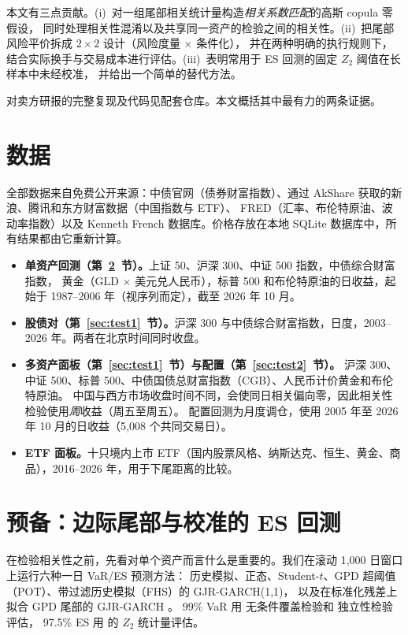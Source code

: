 \documentclass[11pt,UTF8]{ctexart}
\newcommand{\1}{\mathbf{1}}
\begin{document}
本文有三点贡献。(i)~对一组尾部相关统计量构造\emph{相关系数匹配}的高斯 copula 零假设，
同时处理相关性混淆以及共享同一资产的检验之间的相关性。(ii)~把尾部风险平价拆成 $2\times 2$ 设计（风险度量 $\times$ 条件化），
并在两种明确的执行规则下，结合实际换手与交易成本进行评估。(iii)~表明常用于 ES 回测的固定 $Z_2$ 阈值在长样本中未经校准，
并给出一个简单的替代方法。

对卖方研报的完整复现及代码见配套仓库。本文概括其中最有力的两条证据。

\section{数据}

全部数据来自免费公开来源：中债官网（债券财富指数）、通过 AkShare 获取的新浪、腾讯和东方财富数据（中国指数与 ETF）、
FRED（汇率、布伦特原油、波动率指数）以及 Kenneth French 数据库。价格存放在本地 SQLite 数据库中，所有结果都由它重新计算。

\begin{itemize}
\item \textbf{单资产回测（第~\ref{sec:marginal}~节）。}上证 50、沪深 300、中证 500 指数，中债综合财富指数，
黄金（GLD $\times$ 美元兑人民币），标普 500 和布伦特原油的日收益，起始于 1987--2006 年（视序列而定），截至 2026 年 10 月。
\item \textbf{股债对（第~\ref{sec:test1}~节）。}沪深 300 与中债综合财富指数，日度，2003--2026 年。两者在北京时间同时收盘。
\item \textbf{多资产面板（第~\ref{sec:test1}~节）与配置（第~\ref{sec:test2}~节）。}
沪深 300、中证 500、标普 500、中债国债总财富指数（CGB）、人民币计价黄金和布伦特原油。
中国与西方市场收盘时间不同，会使同日相关偏向零，因此相关性检验使用\emph{周}收益（周五至周五）。
配置回测为月度调仓，使用 2005 年至 2026 年 10 月的日收益（5{,}008 个共同交易日）。
\item \textbf{ETF 面板。}十只境内上市 ETF（国内股票风格、纳斯达克、恒生、黄金、商品），2016--2026 年，用于下尾距离的比较。
\end{itemize}

\section{预备：边际尾部与校准的 ES 回测}
\label{sec:marginal}

在检验相关性之前，先看对单个资产而言什么是重要的。我们在滚动 1{,}000 日窗口上运行六种一日 VaR/ES 预测方法：
历史模拟、正态、Student-$t$、GPD 超阈值（POT）、带过滤历史模拟（FHS）的 GJR-GARCH(1,1)，
以及在标准化残差上拟合 GPD 尾部的 GJR-GARCH \citep[GARCH-EVT；][]{mcneil2000,glosten1993}。
99\% VaR 用 \citet{kupiec1995} 无条件覆盖检验和 \citet{christoffersen1998} 独立性检验评估，
97.5\% ES 用 \citet{acerbi2014} 的 $Z_2$ 统计量评估。
\end{document}
